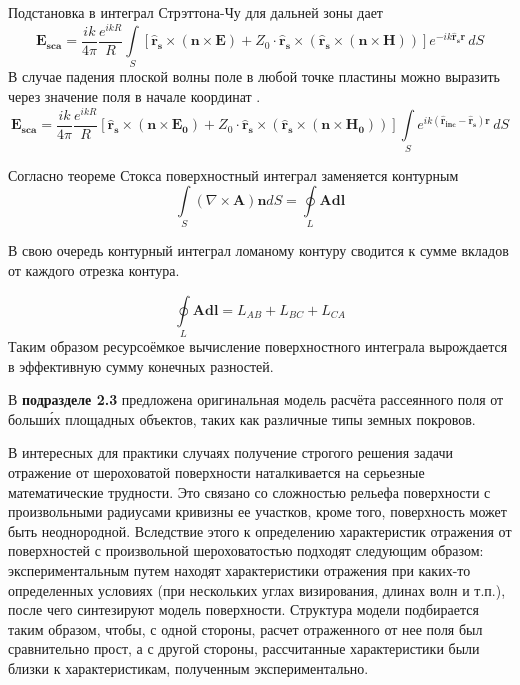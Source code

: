 Подстановка в интеграл Стрэттона-Чу для дальней зоны дает
\[\mathbf{E_{sca}} = \frac{ik}{4\pi}\frac{e^{ikR}}{R}\int \limits_S \left[ \hat{\mathbf{r}}_{\mathbf{s}}\times (\mathbf{n} \times \mathbf{E}) + Z_0  \cdot \hat{\mathbf{r}}_\mathbf{s} \times \left( \hat{\mathbf{r}}_\mathbf{s} \times (\mathbf{n} \times \mathbf{H}) \right) \right] e^{-ik\hat{\mathbf{r}}_\mathbf{s} \mathbf{r}} \,dS  \]
В случае падения плоской волны поле в любой точке пластины можно выразить через значение поля в начале координат \autocite{knott2004radar}.
\begin{equation}
    \label{eq:FacetPOField}
    \mathbf{E_{sca}} = \frac{ik}{4\pi}\frac{e^{ikR}}{R}\left[ \hat{\mathbf{r}}_{\mathbf{s}}\times (\mathbf{n} \times \mathbf{E_0}) + Z_0  \cdot \hat{\mathbf{r}}_\mathbf{s} \times \left( \hat{\mathbf{r}}_\mathbf{s} \times (\mathbf{n} \times \mathbf{H_0}) \right) \right]\int \limits_S  e^{ik(\hat{\mathbf{r}}_\mathbf{inc}-\hat{\mathbf{r}}_\mathbf{s}) \mathbf{r}} \,dS
\end{equation}

Согласно теореме Стокса поверхностный интеграл заменяется контурным
\begin{equation}
    \label{eq:StokesTheorem}
    \int \limits_S ( \nabla \times \mathbf{A}) \mathbf{n}dS=\oint \limits_L \mathbf{Adl}
\end{equation}

В свою очередь контурный интеграл ломаному контуру сводится к сумме вкладов от каждого отрезка контура.

\begin{equation}
    \label{eq:Finite_difference}
    \oint \limits_L \mathbf{Adl} = L_{AB} + L_{BC} + L_{CA}
\end{equation}
Таким образом ресурсоёмкое вычисление поверхностного интеграла вырождается в эффективную сумму конечных разностей.



В \textbf{подразделе 2.3} предложена оригинальная модель расчёта рассеянного поля от
больш\'их площадных объектов, таких как различные типы земных покровов.

В интересных для практики случаях получение строгого решения задачи отражение от
шероховатой поверхности наталкивается на серьезные математические трудности. Это связано
со сложностью рельефа поверхности с произвольными радиусами кривизны ее участков, кроме
того, поверхность может быть неоднородной. Вследствие этого к определению характеристик
отражения от поверхностей с произвольной шероховатостью подходят следующим образом:
экспериментальным путем находят характеристики отражения при каких-то определенных
условиях (при нескольких углах визирования, длинах волн и т.п.), после чего синтезируют
модель поверхности. Структура модели подбирается таким образом, чтобы, с одной стороны,
расчет отраженного от нее поля был сравнительно прост, а с другой стороны, рассчитанные
характеристики были близки к характеристикам, полученным экспериментально.

